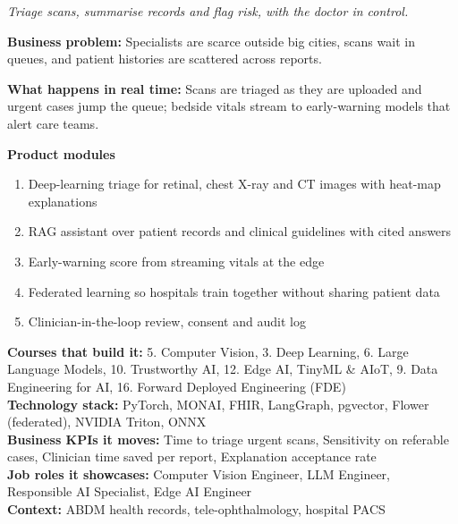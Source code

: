 \documentclass[10pt,a4paper]{article}
\begin{document}
\begin{tcolorbox}[enhanced,breakable,colback=white,colframe=navy,boxrule=0.6pt,arc=2pt,title={\color{goldl}PRODUCT 2 \;|\; HEALTHCARE \& LIFE SCIENCES\\\color{white}\large Clinical Decision \& Medical Imaging Copilot},colbacktitle=navy,fonttitle=\small\bfseries]
{\small\itshape\color{muted}Triage scans, summarise records and flag risk, with the doctor in control.}\par
\begin{tcolorbox}[colback=l1bg,colframe=l1bg,arc=2pt,borderline west={3pt}{0pt}{saffron},top=2pt,bottom=2pt]\small\textbf{Business problem:} Specialists are scarce outside big cities, scans wait in queues, and patient histories are scattered across reports.\end{tcolorbox}
\begin{tcolorbox}[colback=l3bg,colframe=l3bg,arc=2pt,borderline west={3pt}{0pt}{igreen},top=2pt,bottom=2pt]\small\textbf{What happens in real time:} Scans are triaged as they are uploaded and urgent cases jump the queue; bedside vitals stream to early-warning models that alert care teams.\end{tcolorbox}
{\small\textbf{Product modules}}\begin{enumerate}\small
\item Deep-learning triage for retinal, chest X-ray and CT images with heat-map explanations
\item RAG assistant over patient records and clinical guidelines with cited answers
\item Early-warning score from streaming vitals at the edge
\item Federated learning so hospitals train together without sharing patient data
\item Clinician-in-the-loop review, consent and audit log
\end{enumerate}
{\small\textbf{Courses that build it:} 5. Computer Vision, 3. Deep Learning, 6. Large Language Models, 10. Trustworthy AI, 12. Edge AI, TinyML \& AIoT, 9. Data Engineering for AI, 16. Forward Deployed Engineering (FDE)\\\textbf{Technology stack:} PyTorch, MONAI, FHIR, LangGraph, pgvector, Flower (federated), NVIDIA Triton, ONNX\\\textbf{Business KPIs it moves:} Time to triage urgent scans, Sensitivity on referable cases, Clinician time saved per report, Explanation acceptance rate\\\textbf{Job roles it showcases:} Computer Vision Engineer, LLM Engineer, Responsible AI Specialist, Edge AI Engineer\\\textbf{Context:} ABDM health records, tele-ophthalmology, hospital PACS}
\end{tcolorbox}
\end{document}
